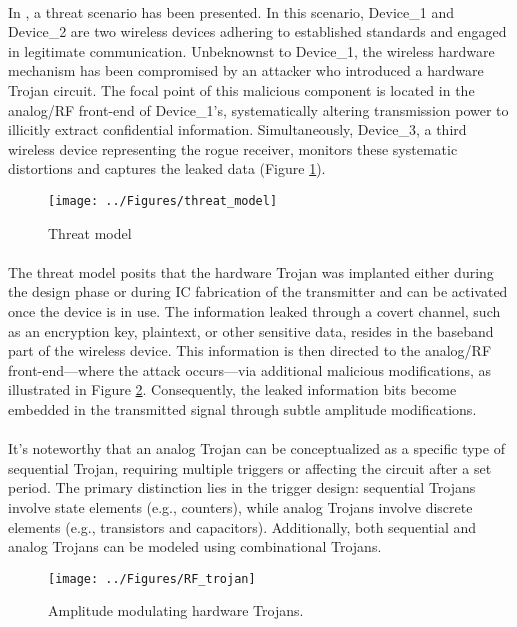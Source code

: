 \paragraph*{}
In \cite{subramani2020amplitude}, a threat scenario has been presented. In this scenario, Device\_1 and Device\_2 are two wireless devices adhering to established standards and engaged in legitimate communication. Unbeknownst to Device\_1, the wireless hardware mechanism has been compromised by an attacker who introduced a hardware Trojan circuit. The focal point of this malicious component is located in the analog/RF front-end of Device\_1's, systematically altering transmission power to illicitly extract confidential information. Simultaneously, Device\_3, a third wireless device representing the rogue receiver, monitors these systematic distortions and captures the leaked data (Figure \ref{fig:threatmodel}).
\begin{figure}[h]
	\centering
	\texttt{[image: ../Figures/threat\_model]}
	\caption{Threat model}
	\label{fig:threatmodel}
\end{figure}

\paragraph*{}
The threat model posits that the hardware Trojan was implanted either during the design phase or during IC fabrication of the transmitter and can be activated once the device is in use. The information leaked through a covert channel, such as an encryption key, plaintext, or other sensitive data, resides in the baseband part of the wireless device. This information is then directed to the analog/RF front-end—where the attack occurs—via additional malicious modifications, as illustrated in Figure \ref{fig:rftrojan}. Consequently, the leaked information bits become embedded in the transmitted signal through subtle amplitude modifications.
\paragraph*{}
It's noteworthy that an analog Trojan can be conceptualized as a specific type of sequential Trojan, requiring multiple triggers or affecting the circuit after a set period. The primary distinction lies in the trigger design: sequential Trojans involve state elements (e.g., counters), while analog Trojans involve discrete elements (e.g., transistors and capacitors). Additionally, both sequential and analog Trojans can be modeled using combinational Trojans.
\begin{figure}[h]
	\centering
	\texttt{[image: ../Figures/RF\_trojan]}
	\caption{Amplitude modulating hardware Trojans.}
	\label{fig:rftrojan}
\end{figure}

